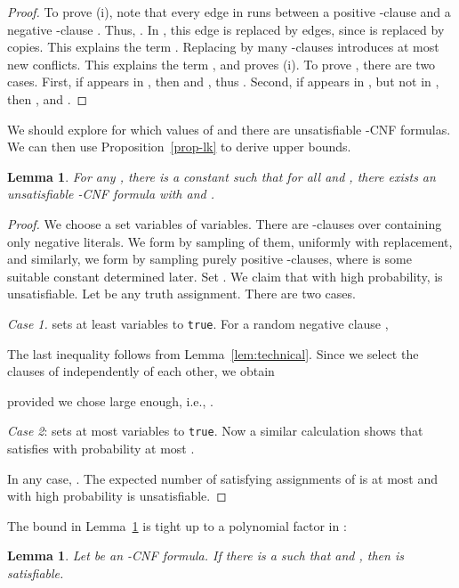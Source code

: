 \documentclass[a4paper, 11pt]{article}
\newtheorem{lemma}[theorem]{Lemma}
\begin{document}
\begin{proof}
  To prove (i), note that every edge in  runs between a
  positive -clause  and a negative -clause . Thus,
  .  In , this edge is replaced by
   edges, since  is replaced by  copies.
  This explains the term . Replacing  by
   many -clauses introduces at most  new
  conflicts. This explains the term , and proves (i).
  To prove , there are two cases. First, if  appears in ,
  then  and , thus . Second, if  appears in , but not
  in , then , and
  .
\end{proof}

We should explore for which values of  and  there are
unsatisfiable -CNF formulas. We can then use
Proposition~\ref{prop-lk} to derive upper bounds.




\begin{lemma}\label{lem:t}
  For any , there is a constant  such that for all
   and , there exists an unsatisfiable
  -CNF formula  with  and . \\
\end{lemma}

\begin{proof}
  We choose a set variables  of 
  variables.  There are  -clauses over  containing
  only negative literals. We form  by sampling 
  of them, uniformly with replacement, and similarly, we form  by
  sampling  purely positive -clauses,
  where  is some suitable constant determined later. Set .  We claim that with high probability,  is
  unsatisfiable.  Let  be any truth assignment. There are two
  cases.
  
  \emph{Case 1.}  sets at least  variables to
  \texttt{true}.  For a random negative clause ,
  
  The last inequality follows from Lemma~\ref{lem:technical}. Since we
  select the clauses of  independently of each other, we obtain
  
  provided we chose  large enough, i.e., .
  
  {\em Case 2}:  sets at most  variables to
  \texttt{true}. Now a similar calculation shows that 
  satisfies  with probability at most .

  In any case, . The expected
  number of satisfying assignments of  is at most  and with high probability  is unsatisfiable.
\end{proof}

The bound in Lemma~\ref{lem:t} is tight up to a polynomial factor in
:

\begin{lemma}
 Let  be an -CNF formula.
  If there is a  such that  and ,
  then  is satisfiable.
\end{lemma}
\end{document}
